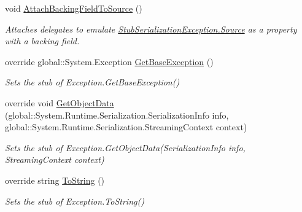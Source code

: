 \begin{DoxyCompactItemize}
void \hyperlink{class_system_1_1_runtime_1_1_serialization_1_1_fakes_1_1_stub_serialization_exception_a91e07beba825b969d2d56708f4ed1414}{Attach\-Backing\-Field\-To\-Source} ()
\begin{DoxyCompactList}\small\item\em Attaches delegates to emulate \hyperlink{class_system_1_1_runtime_1_1_serialization_1_1_fakes_1_1_stub_serialization_exception_ad88c99b8c457f596e7d326e2831e2fcb}{Stub\-Serialization\-Exception.\-Source} as a property with a backing field.\end{DoxyCompactList}\item 
override global\-::\-System.\-Exception \hyperlink{class_system_1_1_runtime_1_1_serialization_1_1_fakes_1_1_stub_serialization_exception_a22aab2b3a58c25001e1af9d3e28bb6b2}{Get\-Base\-Exception} ()
\begin{DoxyCompactList}\small\item\em Sets the stub of Exception.\-Get\-Base\-Exception()\end{DoxyCompactList}\item 
override void \hyperlink{class_system_1_1_runtime_1_1_serialization_1_1_fakes_1_1_stub_serialization_exception_a9666a5523065525eda0fe946b6de303a}{Get\-Object\-Data} (global\-::\-System.\-Runtime.\-Serialization.\-Serialization\-Info info, global\-::\-System.\-Runtime.\-Serialization.\-Streaming\-Context context)
\begin{DoxyCompactList}\small\item\em Sets the stub of Exception.\-Get\-Object\-Data(\-Serialization\-Info info, Streaming\-Context context)\end{DoxyCompactList}\item 
override string \hyperlink{class_system_1_1_runtime_1_1_serialization_1_1_fakes_1_1_stub_serialization_exception_a2b2dc063da2c8c2deb9f7f32243714fe}{To\-String} ()
\begin{DoxyCompactList}\small\item\em Sets the stub of Exception.\-To\-String()\end{DoxyCompactList}\end{DoxyCompactItemize}
